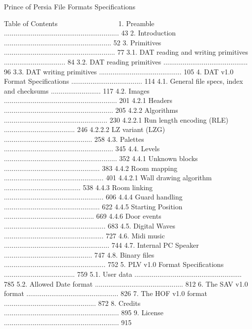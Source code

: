 
                             Prince of Persia
                               File Formats
                              Specifications

Table of Contents
~~~~~ ~~ ~~~~~~~~
1. Preamble ............................................................ 43
2. Introduction ........................................................ 52
3. Primitives .......................................................... 77
3.1. DAT reading and writing primitives ................................ 84
3.2. DAT reading primitives ............................................ 96
3.3. DAT writing primitives ........................................... 105
4. DAT v1.0 Format Specifications ..................................... 114
4.1. General file specs, index and checksums .......................... 117
4.2. Images ........................................................... 201
4.2.1 Headers ......................................................... 205
4.2.2 Algorithms ...................................................... 230
4.2.2.1 Run length encoding (RLE) ..................................... 246
4.2.2.2 LZ variant (LZG) .............................................. 258
4.3. Palettes ......................................................... 345
4.4. Levels ........................................................... 352
4.4.1 Unknown blocks .................................................. 383
4.4.2 Room mapping .................................................... 401
4.4.2.1 Wall drawing algorithm ........................................ 538
4.4.3 Room linking .................................................... 606
4.4.4 Guard handling .................................................. 622
4.4.5 Starting Position ............................................... 669
4.4.6 Door events ..................................................... 683
4.5. Digital Waves .................................................... 727
4.6. Midi music ....................................................... 744
4.7. Internal PC Speaker .............................................. 747
4.8. Binary files ..................................................... 752
5. PLV v1.0 Format Specifications ..................................... 759
5.1. User data ........................................................ 785
5.2. Allowed Date format .............................................. 812
6. The SAV v1.0 format ................................................ 826
7. The HOF v1.0 format ................................................ 872
8. Credits ............................................................ 895
9. License ............................................................ 915


